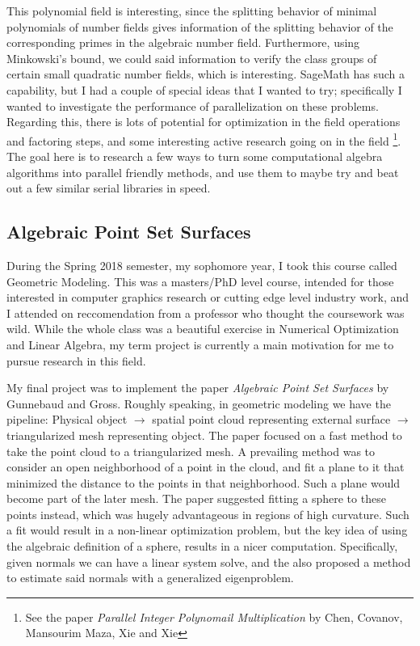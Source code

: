 \documentclass[12pt]{article}
\begin{document}
This polynomial field is interesting, since the splitting behavior of minimal 
polynomials of number fields gives information of the splitting behavior of the
corresponding primes in the algebraic number field. Furthermore, using
Minkowski's bound, we could said information to verify the class groups of
certain small quadratic number fields, which is interesting. SageMath has such a
capability, but I had a couple of special ideas that I wanted to try;
specifically I wanted to investigate the performance of parallelization on these
problems. Regarding this, there is lots of potential for optimization in the
field operations and factoring steps, and some interesting active research going
on in the field \footnote{See the paper \textit{Parallel Integer Polynomail
Multiplication} by Chen, Covanov, Mansourim Maza, Xie and Xie}. The goal here
is to research a few ways to turn some computational algebra algorithms into
parallel friendly methods, and use them to maybe try and beat out a few similar
serial libraries in speed.

\subsection{Algebraic Point Set Surfaces}

During the Spring 2018 semester, my sophomore year, I took this course called
Geometric Modeling. This was a masters/PhD level course, intended for those
interested in computer graphics research or cutting edge level industry work,
and I attended on reccomendation from a professor who thought the coursework was
wild. While the whole class was a beautiful exercise in Numerical Optimization
and Linear Algebra, my term project is currently a main motivation for me to
pursue research in this field.

My final project was to implement the paper \textit{Algebraic Point Set
Surfaces} by Gunnebaud and Gross. Roughly speaking, in geometric modeling we
have the pipeline: Physical object $\to$ spatial point cloud representing
external surface $\to$ triangularized mesh representing object. The paper
focused on a fast method to take the point cloud to a triangularized mesh. A 
prevailing method was to consider an open neighborhood of a point in the cloud,
and fit a plane to it that minimized the distance to the points in that
neighborhood. Such a plane would become part of the later mesh. The paper
suggested fitting a sphere to these points instead, which was hugely
advantageous in regions of high curvature. Such a fit would result in a
non-linear optimization problem, but the key idea of using the algebraic
definition of a sphere, results in a nicer computation. Specifically, given
normals we can have a linear system solve, and the also proposed a method to
estimate said normals with a generalized eigenproblem.
\end{document}
